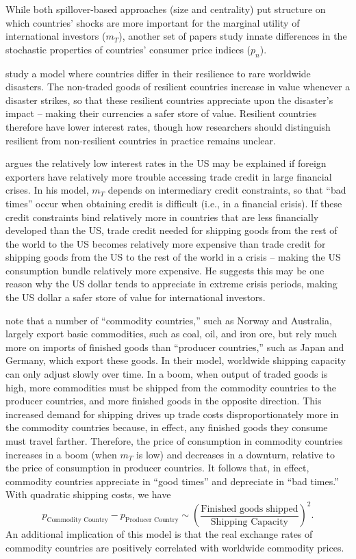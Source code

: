 \documentclass[11pt]{article}
\begin{document}
While both spillover-based approaches (size and centrality) put structure on which countries' shocks are more important for the marginal utility of international investors ($m_T$), another set of papers study innate differences in the stochastic properties of countries' consumer price indices ($p_n$).

\citet{FarhiGabaix2016} study a model where countries differ in their resilience to rare worldwide disasters. The non-traded goods of resilient countries increase in value whenever a disaster strikes, so that these resilient countries appreciate upon the disaster's impact -- making their currencies a safer store of value. Resilient countries therefore have lower interest rates, though how researchers should distinguish resilient from non-resilient countries in practice remains unclear.

\citet{Maggiori2013} argues the relatively low interest rates in the US may be explained if foreign exporters have relatively more trouble accessing trade credit in large financial crises. In his model, $m_T$ depends on intermediary credit constraints, so that ``bad times'' occur when obtaining credit is difficult (i.e., in a financial crisis). If these credit constraints bind relatively more in countries that are less financially developed than the US, trade credit needed for shipping goods from the rest of the world to the US becomes relatively more expensive than trade credit for shipping goods from the US to the rest of the world in a crisis -- making the US consumption bundle relatively more expensive. He suggests this may be one reason why the US dollar tends to appreciate in extreme crisis periods, making the US dollar a safer store of value for international investors.

\citet{Readyetal2013} note that a number of ``commodity countries,'' such as Norway and Australia, largely export basic commodities, such as coal, oil, and iron ore, but rely much more on imports of finished goods than ``producer countries,'' such as Japan and Germany, which export these goods. In their model, worldwide shipping capacity can only adjust slowly over time. In a boom, when output of traded goods is high, more commodities must be shipped from the commodity countries to the producer countries, and more finished goods in the opposite direction. This increased demand for shipping drives up trade costs disproportionately more in the commodity countries because, in effect, any finished goods they consume must travel farther. Therefore, the price of consumption in commodity countries increases in a boom (when $m_T$ is low) and decreases in a downturn, relative to the price of consumption in producer countries. It follows that, in effect, commodity countries appreciate in ``good times'' and depreciate in ``bad times.'' With quadratic shipping costs, we have
\begin{equation*}
  p_{\text{Commodity Country}}-p_{\text{Producer Country}}\sim\left(\frac{\text{Finished goods shipped}}{\text{Shipping Capacity}}\right)^2.
\end{equation*}
An additional implication of this model is that the real exchange rates of commodity countries are positively correlated with worldwide commodity prices. 
\end{document}
